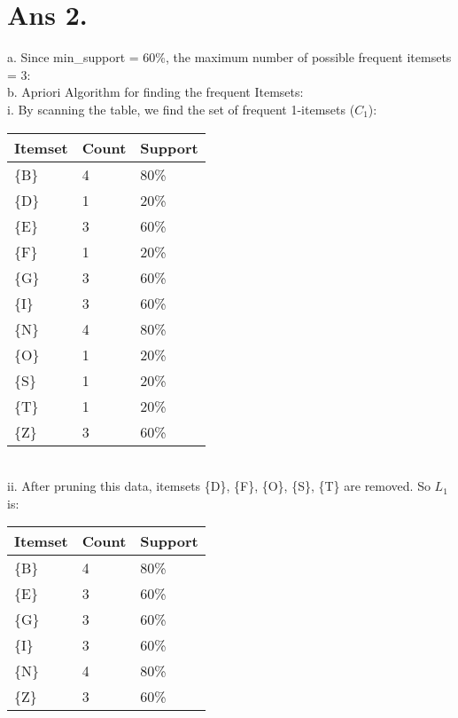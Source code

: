 \documentclass[10pt]{article}
\begin{document}
\section*{Ans 2.}
\begin{flushleft}
a. Since min\_support = 60\%, the maximum number of possible frequent itemsets = 3:\\
\vspace{0.5em}
b. Apriori Algorithm for finding the frequent Itemsets:\\
\vspace{0.5em}
i. By scanning the table, we find the set of frequent 1-itemsets ($C_{1}$):\\
\vspace{0.5em}
\begin{tabular}{| l | l | l |}
\hline
Itemset & Count & Support \\ \hline
\{B\} & 4 & 80\%\\ \hline
\{D\} & 1 & 20\%\\ \hline
\{E\} & 3 & 60\%\\ \hline
\{F\} & 1 & 20\%\\ \hline
\{G\} & 3 & 60\%\\ \hline
\{I\} & 3 & 60\%\\ \hline
\{N\} & 4 & 80\%\\ \hline
\{O\} & 1 & 20\%\\ \hline
\{S\} & 1 & 20\%\\ \hline
\{T\} & 1 & 20\%\\ \hline
\{Z\} & 3 & 60\%\\ \hline
\end{tabular}
\\
\vspace{0.5em}
ii. After pruning this data, itemsets \{D\}, \{F\}, \{O\}, \{S\}, \{T\} are removed. So $L_{1}$ is: \\
\vspace{0.5em}
\begin{tabular}{| l | l | l |}
\hline
Itemset & Count & Support \\ \hline
\{B\} & 4 & 80\%\\ \hline
\{E\} & 3 & 60\%\\ \hline
\{G\} & 3 & 60\%\\ \hline
\{I\} & 3 & 60\%\\ \hline
\{N\} & 4 & 80\%\\ \hline
\{Z\} & 3 & 60\%\\ \hline
\end{tabular}
\\

\end{flushleft}
\end{document}

